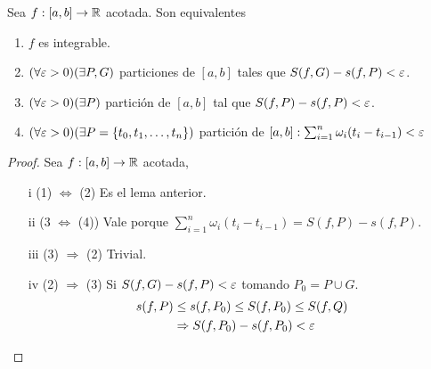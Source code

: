 \begin{theorem}
  Sea \(f: [a, b] \to \mathbb{R} \) acotada. Son equivalentes \begin{enumerate}
    \item \(f\) es integrable.
    \item \((\forall \varepsilon > 0)(\exists P, G)\) particiones de \([a, b]\) tales que \(S(f, G) - s(f, P) < \varepsilon \).
    \item \((\forall \varepsilon > 0)(\exists P)\) partición de \([a, b]\) tal que \(S(f, P) - s(f, P) < \varepsilon \).
    \item \((\forall \varepsilon > 0)(\exists P = \{ t_0, t_1, \ldots, t_n \})\) partición de \([a, b] : \sum_{i = 1}^n \omega_i (t_i - t_{i-1}) < \varepsilon \)
  \end{enumerate}

  \begin{proof}
    Sea \(f: [a,b] \to \mathbb{R} \) acotada,
    \begin{enumerate}
      \item[i] (1) \(\iff \) (2) Es el lema anterior.
      \item[ii] (3 \(\iff \) (4)) Vale porque \(\sum_{i = 1}^n \omega_i (t_i - t_{i-1}) = S(f, P) - s(f, P)\).
      \item[iii] (3) \(\Rightarrow \) (2) Trivial.
      \item[iv] (2) \(\Rightarrow \) (3) Si \(S(f, G) - s(f, P) < \varepsilon \) tomando \(P_0 = P \cup G\).\begin{align*}
              s(f, P) & \leq s(f, P_0) \leq S(f, P_0) \leq S(f, Q) \\
                      & \Rightarrow S(f, P_0) - s(f, P_0) < \varepsilon
            \end{align*}
    \end{enumerate}
  \end{proof}
\end{theorem}

